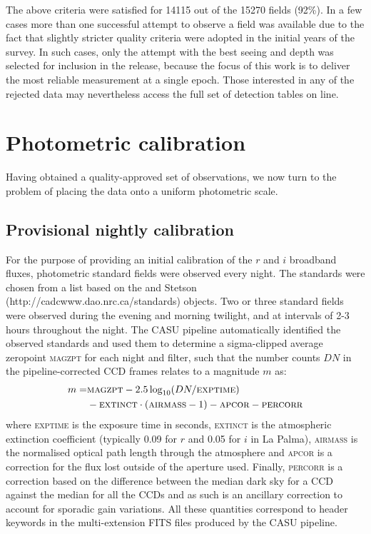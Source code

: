 \documentclass[useAMS,usenatbib]{mn2e}
\begin{document}
The above criteria were satisfied 
for 14115 out of the 15270 fields (92\%).
In a few cases more than one successful attempt to observe
a field was available due to the fact that slightly stricter
quality criteria were adopted in the initial years of the survey.
In such cases, only the attempt 
with the best seeing and depth was selected
for inclusion in the release, because the focus 
of this work is to deliver the most reliable
measurement at a single epoch.
Those interested in any of the rejected data 
may nevertheless access the full set of detection tables 
on line.


\section{Photometric calibration}
\label{sec:calibration}

Having obtained a quality-approved set of observations,
we now turn to the problem of placing the data
onto a uniform photometric scale.

\subsection{Provisional nightly calibration}

For the purpose of providing an initial calibration 
of the $r$ and $i$ broadband fluxes,
photometric standard fields were observed every night.
The standards were chosen from a list based on 
the \cite{Landolt1992} and Stetson (http://cadcwww.dao.nrc.ca/standards) 
objects.
Two or three standard fields were observed 
during the evening and morning twilight,
and at intervals of 2-3 hours throughout the night.
The CASU pipeline automatically identified the observed standards 
and used them to determine a sigma-clipped average zeropoint \textsc{magzpt}
for each night and filter,
such that the number counts $DN$ 
in the pipeline-corrected CCD frames
relates to a magnitude $m$ as:
\begin{equation}
\begin{split}
   m  = & \textsc{magzpt} - 2.5 \log_{10}( DN / \textsc{exptime} ) \\
 &  - \textsc{extinct}\cdot(\textsc{airmass}-1) - \textsc{apcor} - \textsc{percorr}
\label{eqn:mag}
\end{split}
\end{equation}
where \textsc{exptime} is the exposure time in seconds,
\textsc{extinct} is the atmospheric extinction coefficient 
(typically 0.09 for $r$ and 0.05 for $i$ in La Palma),
\textsc{airmass} is the normalised optical path length 
through the atmosphere and
\textsc{apcor} is a correction for the flux
lost outside of the aperture used.
Finally, \textsc{percorr} is a correction based on the difference
between the median dark sky for a CCD against the median for all the CCDs 
and as such is an ancillary correction 
to account for sporadic gain variations. 
All these quantities correspond to header keywords in the 
multi-extension FITS files produced by the CASU pipeline.
\end{document}
